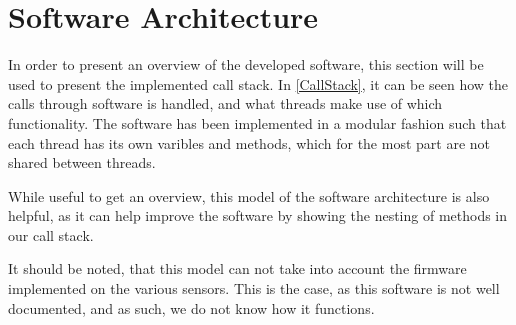 \section{Software Architecture}
In order to present an overview of the developed software, this section will be
used to present the implemented call stack. In \autoref{CallStack}, it can be
seen how the calls through software is handled, and what threads make use of
which functionality. The software has been implemented in a modular fashion such
that each thread has its own varibles and methods, which for the most part are
not shared between threads.\nl

While useful to get an overview, this model of the software architecture is also
helpful, as it can help improve the software by showing the nesting of methods
in our call stack.



It should be noted, that this model can not take into account the firmware
implemented on the various sensors. This is the case, as this software is not
well documented, and as such, we do not know how it functions.


